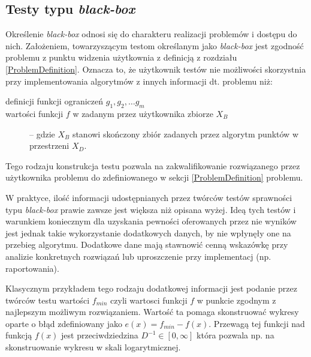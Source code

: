 \documentclass[12pt,a4paper]{report}
\begin{document}
{{{\subsection{Testy typu \emph{black-box}}
\par{
Określenie \emph{black-box} odnosi się do charakteru realizacji problemów i dostępu do nich. Założeniem, towarzyszącym testom określanym jako \emph{black-box} jest zgodność problemu z punktu widzenia użytkownia z definicją z rozdziału \ref{ProblemDefinition}. Oznacza to, że użytkownik testów nie możliwości skorzystnia przy implementowania algorytmów z innych informacji dt. problemu niż:
\begin{description}
\item[definicji funkcji ograniczeń $g_1, g_2, \ldots g_m$]
\item[wartości funkcji $f$ w zadanym przez użytkownika zbiorze $X_B$] -- gdzie $X_B$ stanowi skończony zbiór zadanych przez algorytm punktów w przestrzeni $X_D$.
\end{description}
Tego rodzaju konstrukcja testu pozwala na zakwalifikowanie rozwiązanego przez użytkownika problemu do zdefiniowanego w sekcji \ref{ProblemDefinition} problemu.
}
\par{
W praktyce, ilość informacji udostępnianych przez twórców testów sprawności typu \emph{black-box} prawie zawsze jest większa niż opisana wyżej. Ideą tych testów i warunkiem koniecznym dla uzyskania pewności oferowanych przez nie wyników jest jednak takie wykorzystanie dodatkowych danych, by nie wpłynęły one na przebieg algorytmu. Dodatkowe dane mają stawnowić cenną wskazówkę przy analizie konkretnych rozwiązań lub uproszczenie przy implementacj (np. raportowania).
\par{
Klasycznym przykładem tego rodzaju dodatkowej informacji jest podanie przez twórców testu wartości $f_{min}$ czyli wartosci funkcji $f$ w punkcie zgodnym z najlepszym możliwym rozwiązaniem. Wartość ta pomaga skonstruować wykresy oparte o błąd zdefiniowany jako $e(x) = f_{min} - f(x)$. Przewagą tej funkcji nad funkcją $f(x)$ jest przeciwdziedzina $D^{-1} \in [0, \infty]$ która pozwala np. na skonstruowanie wykresu w skali logarytmicznej.
}

}}}}
\end{document}
